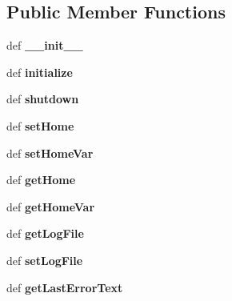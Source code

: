 \subsection*{Public Member Functions}
\begin{DoxyCompactItemize}
\item 
\hypertarget{classgauss_1_1_g_a_u_s_s_aef5dd162b192d0cf67ab7226d81b069e}{def {\bfseries \-\_\-\-\_\-init\-\_\-\-\_\-}}\label{classgauss_1_1_g_a_u_s_s_aef5dd162b192d0cf67ab7226d81b069e}

\item 
\hypertarget{classgauss_1_1_g_a_u_s_s_aecff532f9991b1521a8f46a51de4cf65}{def {\bfseries initialize}}\label{classgauss_1_1_g_a_u_s_s_aecff532f9991b1521a8f46a51de4cf65}

\item 
\hypertarget{classgauss_1_1_g_a_u_s_s_ac75a28e5a5758f51b29aaaee97a09e05}{def {\bfseries shutdown}}\label{classgauss_1_1_g_a_u_s_s_ac75a28e5a5758f51b29aaaee97a09e05}

\item 
\hypertarget{classgauss_1_1_g_a_u_s_s_a8ad9fce3879d840b2e25e766fe87985d}{def {\bfseries set\-Home}}\label{classgauss_1_1_g_a_u_s_s_a8ad9fce3879d840b2e25e766fe87985d}

\item 
\hypertarget{classgauss_1_1_g_a_u_s_s_ac5cda93e1f8656bfb8cd8217163f7818}{def {\bfseries set\-Home\-Var}}\label{classgauss_1_1_g_a_u_s_s_ac5cda93e1f8656bfb8cd8217163f7818}

\item 
\hypertarget{classgauss_1_1_g_a_u_s_s_afa7544823c719248573148bd7b7d0c18}{def {\bfseries get\-Home}}\label{classgauss_1_1_g_a_u_s_s_afa7544823c719248573148bd7b7d0c18}

\item 
\hypertarget{classgauss_1_1_g_a_u_s_s_a103873d73e061564387afcef9b9a8723}{def {\bfseries get\-Home\-Var}}\label{classgauss_1_1_g_a_u_s_s_a103873d73e061564387afcef9b9a8723}

\item 
\hypertarget{classgauss_1_1_g_a_u_s_s_a09de60e5003d4e0fa2bec7e43703478f}{def {\bfseries get\-Log\-File}}\label{classgauss_1_1_g_a_u_s_s_a09de60e5003d4e0fa2bec7e43703478f}

\item 
\hypertarget{classgauss_1_1_g_a_u_s_s_aa78bc3ed88ff369f63f4136259c79edc}{def {\bfseries set\-Log\-File}}\label{classgauss_1_1_g_a_u_s_s_aa78bc3ed88ff369f63f4136259c79edc}

\item 
\hypertarget{classgauss_1_1_g_a_u_s_s_a953d033318b26e67acd70e9be7ec1016}{def {\bfseries get\-Last\-Error\-Text}}\label{classgauss_1_1_g_a_u_s_s_a953d033318b26e67acd70e9be7ec1016}


\end{DoxyCompactItemize}
